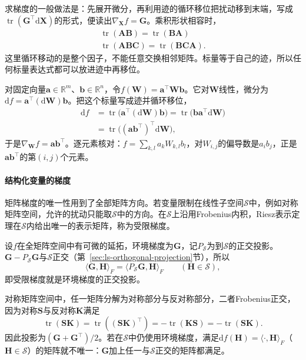 求梯度的一般做法是：先展开微分，再利用迹的循环移位把扰动移到末端，写成$\operatorname{tr}(\bm G^\top\mathrm d\bm X)$的形式，便读出$\nabla_{\bm X}f=\bm G$。乘积形状相容时，
\[
 \begin{gathered}
\operatorname{tr}(\bm A\bm B)=\operatorname{tr}(\bm B\bm A)\\
\operatorname{tr}(\bm A\bm B\bm C)=\operatorname{tr}(\bm B\bm C\bm A).
 \end{gathered}
\]
这里循环移动的是整个因子，不能任意交换相邻矩阵。标量等于自己的迹，所以任何标量表达式都可以放进迹中再移位。
\begin{example}[双线性函数的矩阵梯度]
\label{ex:multivariable-bilinear-matrix-gradient}
对固定向量$\bm a\in\mathbb R^m$、$\bm b\in\mathbb R^n$，令$f(\bm W)=\bm a^\top\bm W\bm b$。它对$\bm W$线性，微分为$\mathrm df=\bm a^\top(\mathrm d\bm W)\bm b$。把这个标量写成迹并循环移位，
\[
 \begin{aligned}
 \mathrm df
 &=\operatorname{tr}\bigl(\bm a^\top(\mathrm d\bm W)\bm b\bigr)=\operatorname{tr}\bigl(\bm b\bm a^\top\mathrm d\bm W\bigr)\\
 &=\operatorname{tr}\bigl((\bm a\bm b^\top)^\top\mathrm d\bm W\bigr),
 \end{aligned}
\]
于是$\nabla_{\bm W}f=\bm a\bm b^\top$。逐元素核对：$f=\sum_{k,l}a_kW_{k,l}b_l$，对$W_{i,j}$的偏导数是$a_ib_j$，正是$\bm a\bm b^\top$的第$(i,j)$个元素。
\end{example}

\paragraph{结构化变量的梯度}
矩阵梯度的唯一性用到了全部矩阵方向。若变量限制在线性子空间$\mathcal S$中，例如对称矩阵空间，允许的扰动只能取$\mathcal S$中的方向。在$\mathcal S$上沿用Frobenius内积，Riesz表示定理在$\mathcal S$内给出唯一的表示矩阵，称为受限梯度。

设$f$在全矩阵空间中有可微的延拓，环境梯度为$\bm G$，记$P_{\mathcal S}$为到$\mathcal S$的正交投影。$\bm G-P_{\mathcal S}\bm G$与$\mathcal S$正交（第~\ref{sec:ls-orthogonal-projection}节），所以
\[
 \langle\bm G,\bm H\rangle_F=\langle P_{\mathcal S}\bm G,\bm H\rangle_F\qquad(\bm H\in\mathcal S),
\]
即受限梯度就是环境梯度的正交投影。

对称矩阵空间中，任一矩阵分解为对称部分与反对称部分，二者Frobenius正交，因为对称$\bm S$与反对称$\bm K$满足
\[
 \operatorname{tr}(\bm S\bm K)=\operatorname{tr}((\bm S\bm K)^\top)=-\operatorname{tr}(\bm K\bm S)=-\operatorname{tr}(\bm S\bm K).
\]
因此投影为$(\bm G+\bm G^\top)/2$。若在$\mathcal S$中仍使用环境梯度，满足$\mathrm df(\bm H)=\langle\cdot,\bm H\rangle_F$（$\bm H\in\mathcal S$）的矩阵就不唯一：$\bm G$加上任一与$\mathcal S$正交的矩阵都满足。



